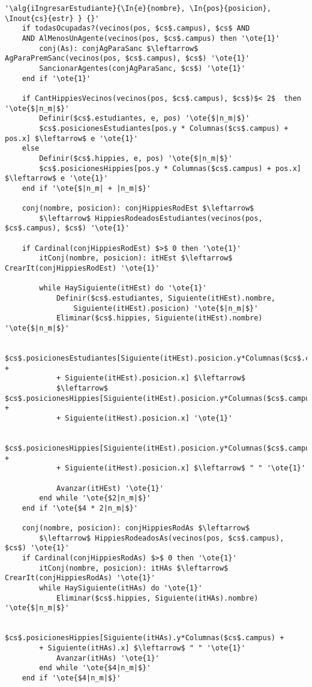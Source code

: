 \begin{lstlisting}[mathescape]
'\alg{iIngresarEstudiante}{\In{e}{nombre}, \In{pos}{posicion}, \Inout{cs}{estr} } {}'
	if todasOcupadas?(vecinos(pos, $cs$.campus), $cs$ AND 
	AND AlMenosUnAgente(vecinos(pos, $cs$.campus) then '\ote{1}'
		conj(As): conjAgParaSanc $\leftarrow$ AgParaPremSanc(vecinos(pos, $cs$.campus), $cs$) '\ote{1}'
		SancionarAgentes(conjAgParaSanc, $cs$) '\ote{1}'
	end if '\ote{1}'

	if CantHippiesVecinos(vecinos(pos, $cs$.campus), $cs$)$< 2$  then '\ote{$|n_m|$}'
		Definir($cs$.estudiantes, e, pos) '\ote{$|n_m|$}'
		$cs$.posicionesEstudiantes[pos.y * Columnas($cs$.campus) + pos.x] $\leftarrow$ e '\ote{1}'
	else
		Definir($cs$.hippies, e, pos) '\ote{$|n_m|$}'
		$cs$.posicionesHippies[pos.y * Columnas($cs$.campus) + pos.x] $\leftarrow$ e '\ote{1}'
	end if '\ote{$|n_m| + |n_m|$}'
	
	conj(nombre, posicion): conjHippiesRodEst $\leftarrow$ 
		$\leftarrow$ HippiesRodeadosEstudiantes(vecinos(pos, $cs$.campus), $cs$) '\ote{1}'

	if Cardinal(conjHippiesRodEst) $>$ 0 then '\ote{1}'
		itConj(nombre, posicion): itHEst $\leftarrow$ CrearIt(conjHippiesRodEst) '\ote{1}'
		
		while HaySiguiente(itHEst) do '\ote{1}'
			Definir($cs$.estudiantes, Siguiente(itHEst).nombre, 
				Siguiente(itHEst).posicion) '\ote{$|n_m|$}'
			Eliminar($cs$.hippies, Siguiente(itHEst).nombre) '\ote{$|n_m|$}'
			
			$cs$.posicionesEstudiantes[Siguiente(itHEst).posicion.y*Columnas($cs$.campus) + 
			+ Siguiente(itHEst).posicion.x] $\leftarrow$ 
			$\leftarrow$ $cs$.posicionesHippies[Siguiente(itHEst).posicion.y*Columnas($cs$.campus) + 
			+ Siguiente(itHest).posicion.x] '\ote{1}'
			
			$cs$.posicionesHippies[Siguiente(itHEst).posicion.y*Columnas($cs$.campus) + 
			+ Siguiente(itHest).posicion.x] $\leftarrow$ " " '\ote{1}'
			
			Avanzar(itHEst) '\ote{1}'
		end while '\ote{$2|n_m|$}'
	end if '\ote{$4 * 2|n_m|$}'

	conj(nombre, posicion): conjHippiesRodAs $\leftarrow$
		$\leftarrow$ HippiesRodeadosAs(vecinos(pos, $cs$.campus), $cs$) '\ote{1}'
	if Cardinal(conjHippiesRodAs) $>$ 0 then '\ote{1}'
		itConj(nombre, posicion): itHAs $\leftarrow$ CrearIt(conjHippiesRodAs) '\ote{1}'	
		while HaySiguiente(itHAs) do '\ote{1}'
			Eliminar($cs$.hippies, Siguiente(itHAs).nombre) '\ote{$|n_m|$}'
			
			$cs$.posicionesHippies[Siguiente(itHAs).y*Columnas($cs$.campus) +
		+ Siguiente(itHAs).x] $\leftarrow$ " " '\ote{1}'
			Avanzar(itHAs) '\ote{1}'
		end while '\ote{$4|n_m|$}'
	end if '\ote{$4|n_m|$}'


\end{lstlisting}
